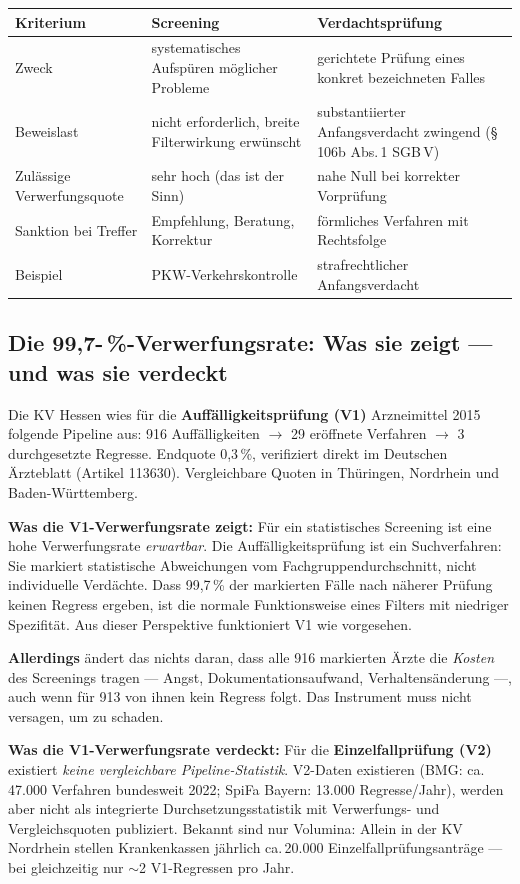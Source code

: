\documentclass{umbruch-position}
\begin{document}
{\small
\begin{tabularx}{\textwidth}{X X X}
\toprule
\textbf{Kriterium} & \textbf{Screening} & \textbf{Verdachtsprüfung} \\
\midrule
Zweck & systematisches Aufspüren möglicher Probleme & gerichtete Prüfung eines konkret bezeichneten Falles \\
Beweislast & nicht erforderlich, breite Filterwirkung erwünscht & substantiierter Anfangsverdacht zwingend (\S\,106b Abs.\,1 SGB\,V) \\
Zulässige Verwerfungsquote & sehr hoch (das ist der Sinn) & nahe Null bei korrekter Vorprüfung \\
Sanktion bei Treffer & Empfehlung, Beratung, Korrektur & förmliches Verfahren mit Rechtsfolge \\
Beispiel & PKW-Verkehrskontrolle & strafrechtlicher Anfangsverdacht \\
\bottomrule
\end{tabularx}
}


\subsection{Die 99,7-\,\%-Verwerfungsrate: Was sie zeigt --- und was sie verdeckt}

Die KV Hessen wies für die \textbf{Auffälligkeitsprüfung (V1)} Arzneimittel 2015 folgende Pipeline aus: 916 Auffälligkeiten $\to$ 29 eröffnete Verfahren $\to$ 3 durchgesetzte Regresse. Endquote 0,3\,\%, verifiziert direkt im Deutschen Ärzteblatt (Artikel 113630). Vergleichbare Quoten in Thüringen, Nordrhein und Baden-Württemberg.

\textbf{Was die V1-Verwerfungsrate zeigt:} Für ein statistisches Screening ist eine hohe Verwerfungsrate \textit{erwartbar}. Die Auffälligkeitsprüfung ist ein Suchverfahren: Sie markiert statistische Abweichungen vom Fachgruppendurchschnitt, nicht individuelle Verdächte. Dass 99,7\,\% der markierten Fälle nach näherer Prüfung keinen Regress ergeben, ist die normale Funktionsweise eines Filters mit niedriger Spezifität. Aus dieser Perspektive funktioniert V1 wie vorgesehen.

\textbf{Allerdings} ändert das nichts daran, dass alle 916 markierten Ärzte die \textit{Kosten} des Screenings tragen --- Angst, Dokumentationsaufwand, Verhaltensänderung ---, auch wenn für 913 von ihnen kein Regress folgt. Das Instrument muss nicht versagen, um zu schaden.

\textbf{Was die V1-Verwerfungsrate verdeckt:} Für die \textbf{Einzelfallprüfung (V2)} existiert \textit{keine vergleichbare Pipeline-Statistik}. V2-Daten existieren (BMG: ca.\,47.000 Verfahren bundesweit 2022; SpiFa Bayern: 13.000 Regresse/Jahr), werden aber nicht als integrierte Durchsetzungsstatistik mit Verwerfungs- und Vergleichsquoten publiziert. Bekannt sind nur Volumina: Allein in der KV Nordrhein stellen Krankenkassen jährlich ca.\,20.000 Einzelfallprüfungsanträge --- bei gleichzeitig nur $\sim$2 V1-Regressen pro Jahr.
\end{document}
